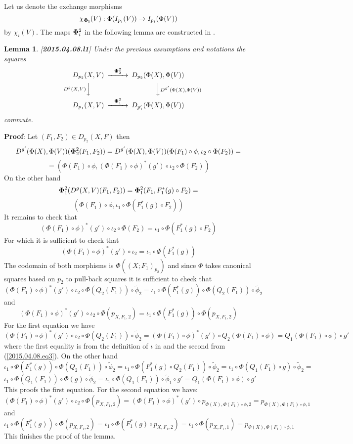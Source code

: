 \documentclass[12pt]{article}
\newenvironment{myproof}{{\bf Proof}:}{\vskip 5mm }
\newtheorem{lemma}[proposition]{Lemma}
\newcommand{\llabel}[1]{\label{#1}[{\bf #1}]}
\newcommand{\sr}{\rightarrow}
\newcommand{\wt}{\widetilde}
\begin{document}
%
Let us denote the exchange morphisms
%
$$\chi_{\bf\Phi_i}(V):\Phi(I_{p_i}(V))\sr I_{p_i}(\Phi(V))$$
%
by $\chi_i(V)$. The maps ${\bf\Phi}_i^2$ in the following lemma are constructed in \cite[Construction 5.2]{fromunivwithPi}. 
%
\begin{lemma}
\llabel{2015.04.08.l1}
Under the previous assumptions and notations the squares
%
$$
\begin{CD}
D_{p_2}(X,V) @>{\bf\Phi}_2^2>> D_{p_2}(\Phi(X),\Phi(V))\\
@V{D^g(X,V)} VV @VV {D^{g'}(\Phi(X),\Phi(V))}V\\
D_{p_1}(X,V) @>{\bf\Phi}_1^2>> D_{p_1'}(\Phi(X),\Phi(V))
\end{CD}
$$
%
commute.
\end{lemma}
%
\begin{myproof}
Let $(F_1,F_2)\in D_{p_2}(X,F)$ then
%
$$D^{g'}(\Phi(X),\Phi(V))({\bf\Phi}_2^2(F_1,F_2))=D^{g'}(\Phi(X),\Phi(V))(\Phi(F_1)\circ \phi, \iota_2\circ \Phi(F_2))=$$
$$=(\Phi(F_1)\circ \phi, (\Phi(F_1)\circ \phi)^*(g')\circ \iota_2\circ \Phi(F_2))$$
%
On the other hand
%
$${\bf\Phi}_1^2(D^g(X,V)(F_1,F_2))={\bf\Phi}_1^2(F_1,F_1^*(g)\circ F_2)=$$
$$(\Phi(F_1)\circ\phi,\iota_1\circ \Phi(F_1^*(g)\circ F_2))$$
%
It remains to check that 
%
$$(\Phi(F_1)\circ \phi)^*(g')\circ \iota_2\circ \Phi(F_2)=\iota_1\circ \Phi(F_1^*(g)\circ F_2)$$
%
For which it is sufficient to check that
%
$$(\Phi(F_1)\circ \phi)^*(g')\circ \iota_2=\iota_1\circ \Phi(F_1^*(g))$$
%
The codomain of both morphisms is $\Phi((X;F_1)_{p_2})$ and since $\Phi$ takes canonical squares based on $p_2$ to pull-back squares it is sufficient to check that 
%
$$(\Phi(F_1)\circ \phi)^*(g')\circ \iota_2\circ \Phi(Q_2(F_1))\circ\wt{\phi}_2=\iota_1\circ \Phi(F_1^*(g))\circ \Phi(Q_2(F_1))\circ\wt{\phi}_2$$
%
and
%
$$(\Phi(F_1)\circ \phi)^*(g')\circ \iota_2\circ \Phi(p_{X,F_1,2})=\iota_1\circ \Phi(F_1^*(g))\circ \Phi(p_{X,F_1,2})$$
%
For the first equation we have
%
$$(\Phi(F_1)\circ \phi)^*(g')\circ \iota_2\circ \Phi(Q_2(F_1))\circ\wt{\phi}_2=(\Phi(F_1)\circ \phi)^*(g')\circ Q_2(\Phi(F_1)\circ \phi)=Q_1(\Phi(F_1)\circ\phi)\circ g'$$
%
where the first equality is from the definition of $\iota$ in \cite[Construction 5.2]{fromunivwithPi} and the second from (\ref{2015.04.08.eq3}). On the other hand
%
$$\iota_1\circ \Phi(F_1^*(g))\circ \Phi(Q_2(F_1))\circ\wt{\phi}_2=\iota_1\circ\Phi(F_1^*(g)\circ Q_2(F_1))\circ \wt{\phi}_2=\iota_1\circ \Phi(Q_1(F_1)\circ g)\circ \wt{\phi}_2=$$
$$\iota_1\circ \Phi(Q_1(F_1))\circ \Phi(g)\circ \wt{\phi}_2=\iota_1\circ \Phi(Q_1(F_1))\circ \wt{\phi}_1\circ g'=Q_1(\Phi(F_1)\circ \phi)\circ g'$$
%
This proofs the first equation. For the second equation we have:
%
$$(\Phi(F_1)\circ \phi)^*(g')\circ \iota_2\circ \Phi(p_{X,F_1,2})=(\Phi(F_1)\circ \phi)^*(g')\circ p_{\Phi(X),\Phi(F_1)\circ\phi,2}=p_{\Phi(X),\Phi(F_1)\circ\phi,1}$$
%
and
%
$$\iota_1\circ \Phi(F_1^*(g))\circ \Phi(p_{X,F_1,2})=\iota_1\circ \Phi(F_1^*(g)\circ p_{X,F_1,2})=\iota_1\circ \Phi(p_{X,F_1,1})=p_{\Phi(X),\Phi(F_1)\circ \phi,1}$$
%
This finishes the proof of the lemma. 
\end{myproof}
\end{document}

